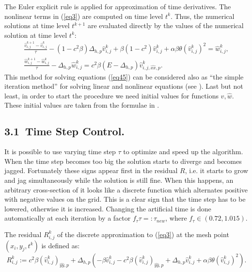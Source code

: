 \documentclass[leqno,11pt]{book}
\newcommand{\rf}[1]{(\ref{#1})}
\begin{document}
\par
The Euler explicit rule is applied for approximation of  time derivatives. The nonlinear terms in \rf{eq3} are computed on    time level $t^k$. Thus, the numerical solutions at time level $t^{k+1}$ are evaluated directly by the values of the numerical solution at time level $t^k$:  
 \begin{equation}\label{eq55}
 \begin{split}
   \frac {\widehat{v}_{i,j}^{k+1}-\widehat{v}_{i,j}^{k}}{\tau}- (1-c^2 \beta) \Delta_{h,p} \widehat{v} _{i,j}^{k}+ \beta (1-c^2     ) \widehat{v}_{i,j}^{k} + \alpha \beta \theta (\widehat{v}_{i,j}^{k})^2 = \widehat{w}_{i,j}^{k}, \\
  \frac  {\widehat{w}_{i,j}^{k+1} -\widehat{w}_{i,j}^{k}} {\tau} - \Delta_{h,p} \widehat{w}_{i,j}^{k} =  c^2 \beta (E- \Delta_{h,p})       
    \widehat{v}_{i,j,{\widehat{xx},p}}^{k}. \;\;\;\; \;\;\;\;\;\;\;\;\;\;\;\;
\end{split}
\end{equation}
This method for solving equations 
\rf{eq45} can be considered also as ``the simple iteration method'' for solving linear and nonlinear equations (see \cite{sam}).
Last but not least, in order to start the procedure we need initial values for functions $\widehat{v},\widehat{w}$. These initial values are taken from the formulae in \cite{Ch2011}.

\subsection{3.1~Time Step Control.}
It is possible to use varying time step $\tau$ to optimize and speed up the algorithm. When the time step becomes too big the solution starts to diverge and becomes jagged. Fortunately these signs appear first in the residual $R$,  i.e. it starts to grow and jag simultaneously while the solution is still fine. 
When this happens, an arbitrary cross-section of it looks like a discrete function which alternates positive with negative values on the grid.
This is a clear sign that the time step has to be lowered, otherwise it is increased. Changing the artificial time is done automatically at each iteration by a factor $f_{\tau}\tau =: \tau_{new}$, where $f_{\tau} \in (0.72, 1.015)$. 

The residual $R^k_{i,j}$ of the discrete approximation to \rf{eq3} at the mesh point $(x_i,y_j,t^k)$ is defined as:
\begin{equation}\label{residual}
R_{i,j}^k := 
c^2\beta (\widehat{v}^k_{i,j})_{\widehat{yy},p} + \Delta_{h,p}(-\beta \widehat{v}^k_{i,j} - c^2\beta (\widehat{v}^k_{i,j})_{\widehat{yy},p} + \Delta_{h,p} \widehat{v}^k_{i,j} 
+ \alpha \beta \theta (\widehat{v}^k_{i,j})^2  ).
\end{equation}
 
\end{document}

